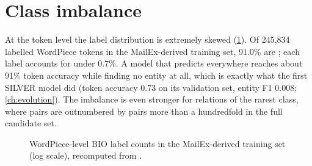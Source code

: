 \section{Class imbalance}
\label{sec:imbalance}
At the token level the label distribution is extremely skewed (\cref{fig:bioimbalance}). Of 245,834 labelled WordPiece tokens in the MailEx-derived training set, 91.0\% are ; each  label accounts for under 0.7\%. A model that predicts  everywhere reaches about 91\% token accuracy while finding no entity at all, which is exactly what the first SILVER model did (token accuracy 0.73 on its validation set, entity F1 0.008; \cref{ch:evolution}). The imbalance is even stronger for relations of the rarest class, where  pairs are outnumbered by  pairs more than a hundredfold in the full candidate set.

\begin{figure}[t]
\centering
{}
\caption[BIO label imbalance]{WordPiece-level BIO label counts in the MailEx-derived training set (log scale), recomputed from .}
\label{fig:bioimbalance}
\end{figure}


